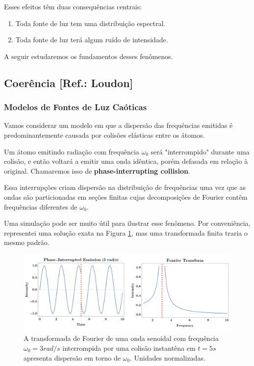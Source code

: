 \documentclass[12pt,a4paper]{report}
\begin{document}
Esses efeitos têm duas consequências centrais:

\begin{enumerate}
    \item Toda fonte de luz tem uma distribuição espectral.
    \item Toda fonte de luz terá algum ruído de intensidade.
\end{enumerate}

A seguir estudaremos os fundamentos desses fenômenos.

\subsection{Coerência \small{[Ref.: Loudon]}}

\subsubsection{Modelos de Fontes de Luz Caóticas}

Vamos considerar um modelo em que a dispersão das frequências emitidas é predominantemente causada por colisões elásticas entre os átomos.

Um átomo emitindo radiação com frequência $\omega_0$ será "interrompido" durante uma colisão, e então voltará a emitir uma onda idêntica, porém defasada em relação à original. Chamaremos isso de \textbf{phase-interrupting collision}.

Essa interrupções criam dispersão na distribuição de frequências uma vez que as ondas são particionadas em seções finitas cujas decomposições de Fourier contêm frequências diferentes de $\omega_0$.

Uma simulação pode ser muito útil para ilustrar esse fenômeno. Por conveniência, representei uma solução exata na Figura \ref{phase-fourier}, mas uma transformada finita traria o mesmo padrão.

\begin{figure}[H]
    \centering
    \includegraphics[width=1\linewidth]{phaseinterrupted emission.png}
    \caption{A transformada de Fourier de uma onda senoidal com frequência $\omega_0=3 rad/s$ interrompida por uma colisão instantêna em $t=5 s$ apresenta dispersão em torno de $\omega_0$. Unidades normalizadas.}
    \label{phase-fourier}
\end{figure}
\end{document}
